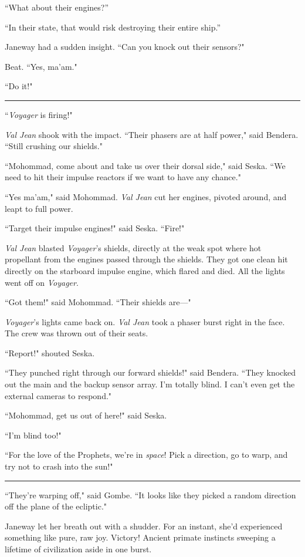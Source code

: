\documentclass[twoside,letterpaper,12pt]{memoir}
\begin{document}
``What about their engines?''

``In their state, that would risk destroying their entire ship.''

Janeway had a sudden insight. ``Can you knock out their sensors?"

Beat. ``Yes, ma'am."

``Do it!"

\fancybreak{\rule{3cm}{0.4 pt}}
\noindent``\textit{Voyager} is firing!"

\textit{Val Jean} shook with the impact. ``Their phasers are at half power," said Bendera. ``Still crushing our shields."

``Mohommad, come about and take us over their dorsal side," said Seska. ``We need to hit their impulse reactors if we want to have any chance."

``Yes ma'am," said Mohommad. \textit{Val Jean} cut her engines, pivoted around, and leapt to full power.

``Target their impulse engines!" said Seska. ``Fire!"

\textit{Val Jean} blasted \textit{Voyager}'s shields, directly at the weak spot where hot propellant from the engines passed through the shields. They got one clean hit directly on the starboard impulse engine, which flared and died. All the lights went off on \textit{Voyager}.

``Got them!" said Mohommad. ``Their shields are---"

\textit{Voyager}'s lights came back on. \textit{Val Jean} took a phaser burst right in the face. The crew was thrown out of their seats.

``Report!" shouted Seska.

``They punched right through our forward shields!" said Bendera. ``They knocked out the main and the backup sensor array. I'm totally blind. I can't even get the external cameras to respond."

``Mohommad, get us out of here!" said Seska.

``I'm blind too!"

``For the love of the Prophets, we're in \textit{space}! Pick a direction, go to warp, and try not to crash into the sun!"

\fancybreak{\rule{3cm}{0.4 pt}}
\noindent ``They're warping off," said Gombe. ``It looks like they picked a random direction off the plane of the ecliptic."

Janeway let her breath out with a shudder. For an instant, she'd experienced something like pure, raw joy. Victory! Ancient primate instincts sweeping a lifetime of civilization aside in one burst.
\end{document}
